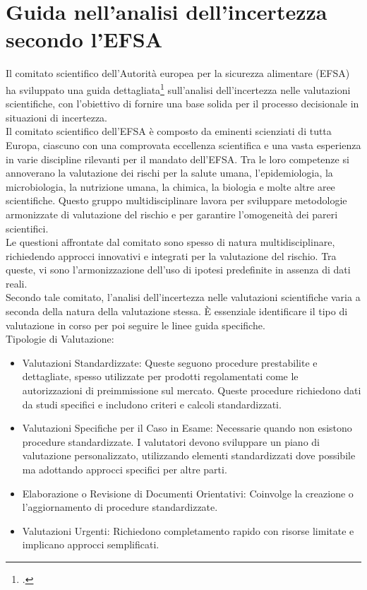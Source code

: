 \section{Guida nell'analisi dell'incertezza secondo l'EFSA}
Il comitato scientifico dell'Autorità europea per la sicurezza alimentare (EFSA) ha sviluppato una guida dettagliata\footcite{womak:guida-analisi-incertezza} sull'analisi dell'incertezza nelle valutazioni scientifiche, con l'obiettivo di fornire una base solida per il processo decisionale in situazioni di incertezza.\\

Il comitato scientifico dell'EFSA è composto da eminenti scienziati di tutta Europa, ciascuno con una comprovata eccellenza scientifica e una vasta esperienza in varie discipline rilevanti per il mandato dell'EFSA. Tra le loro competenze si annoverano la valutazione dei rischi per la salute umana, l'epidemiologia, la microbiologia, la nutrizione umana, la chimica, la biologia e molte altre aree scientifiche. Questo gruppo multidisciplinare lavora per sviluppare metodologie armonizzate di valutazione del rischio e per garantire l'omogeneità dei pareri scientifici.\\

Le questioni affrontate dal comitato sono spesso di natura multidisciplinare, richiedendo approcci innovativi e integrati per la valutazione del rischio. Tra queste, vi sono l'armonizzazione dell'uso di ipotesi predefinite in assenza di dati reali.\\

Secondo tale comitato, l'analisi dell'incertezza nelle valutazioni scientifiche varia a seconda della natura della valutazione stessa. È essenziale identificare il tipo di valutazione in corso per poi seguire le linee guida specifiche.\\

Tipologie di Valutazione:
\begin{itemize}
    \item Valutazioni Standardizzate: Queste seguono procedure prestabilite e dettagliate, spesso utilizzate per prodotti regolamentati come le autorizzazioni di preimmissione sul mercato. Queste procedure richiedono dati da studi specifici e includono criteri e calcoli standardizzati.
    \item  Valutazioni Specifiche per il Caso in Esame: Necessarie quando non esistono procedure standardizzate. I valutatori devono sviluppare un piano di valutazione personalizzato, utilizzando elementi standardizzati dove possibile ma adottando approcci specifici per altre parti.
    \item  Elaborazione o Revisione di Documenti Orientativi: Coinvolge la creazione o l'aggiornamento di procedure standardizzate.
    \item  Valutazioni Urgenti: Richiedono completamento rapido con risorse limitate e implicano approcci semplificati.
    
\end{itemize}

